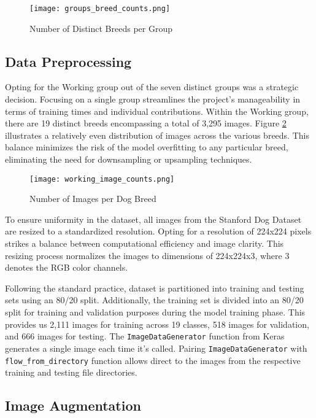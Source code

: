 \documentclass[11pt]{article}
\begin{document}
\begin{figure}[h]
\centering
\texttt{[image: groups\_breed\_counts.png]}
\caption{\label{fig:group_counts}Number of Distinct Breeds per Group}
\end{figure}

\newpage

\subsection{Data Preprocessing}

Opting for the Working group out of the seven distinct groups was a strategic decision. Focusing on a single group streamlines the project's manageability in terms of training times and individual contributions. Within the Working group, there are 19 distinct breeds encompassing a total of 3,295 images. Figure \ref{fig:image_counts} illustrates a relatively even distribution of images across the various breeds. This balance minimizes the risk of the model overfitting to any particular breed, eliminating the need for downsampling or upsampling techniques.

\begin{figure}[h]
\centering
\texttt{[image: working\_image\_counts.png]}
\caption{\label{fig:image_counts}Number of Images per Dog Breed}
\end{figure}

To ensure uniformity in the dataset, all images from the Stanford Dog Dataset are resized to a standardized resolution. Opting for a resolution of 224x224 pixels strikes a balance between computational efficiency and image clarity. This resizing process normalizes the images to dimensions of 224x224x3, where 3 denotes the RGB color channels.

Following the standard practice, dataset is partitioned into training and testing sets using an 80/20 split. Additionally, the training set is divided into an 80/20 split for training and validation purposes during the model training phase. This provides us 2,111 images for training across 19 classes, 518 images for validation, and 666 images for testing. The \texttt{ImageDataGenerator} function from Keras generates a single image each time it's called. Pairing \texttt{ImageDataGenerator} with \texttt{flow\_from\_directory} function allows direct to the images from the respective training and testing file directories.  

\subsection{Image Augmentation}
\end{document}

